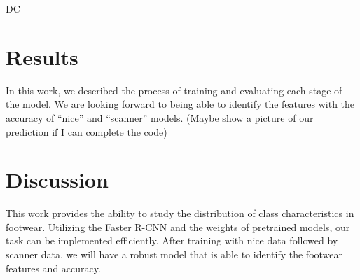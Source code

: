 \documentclass[10pt]{article}
\begin{document}

DC



\section{Results}

In this work, we described the process of training and evaluating each stage of the model. We are looking forward to being able to identify the features with the accuracy of “nice” and “scanner” models.  (Maybe show a picture of our prediction if I can complete the code)



\section{Discussion }
This work provides the ability to study the distribution of class characteristics in footwear. Utilizing the Faster R-CNN and the weights of pretrained models, our task can be implemented efficiently. After training with nice data followed by scanner data, we will have a robust model that is able to identify the footwear features and accuracy.
\end{document}
